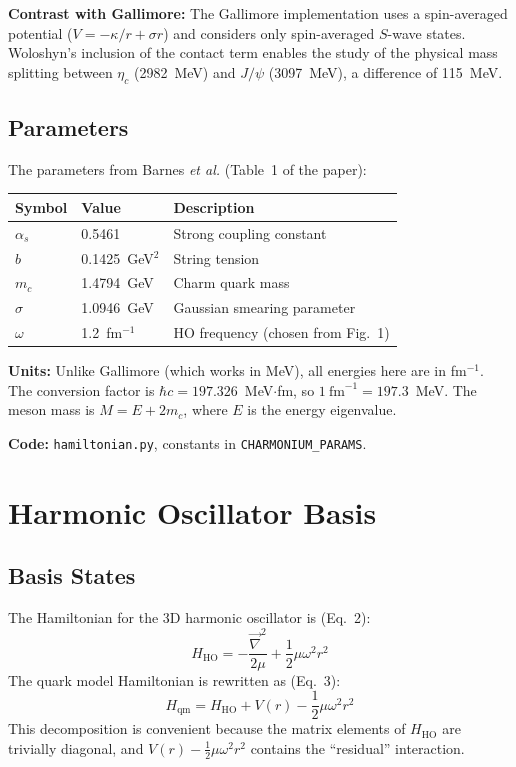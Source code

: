 \documentclass[11pt,a4paper]{article}
\begin{document}
\textbf{Contrast with Gallimore:} The Gallimore implementation uses a spin-averaged potential ($V = -\kappa/r + \sigma r$) and considers only spin-averaged $S$-wave states. Woloshyn's inclusion of the contact term enables the study of the physical mass splitting between $\eta_c$ (2982~MeV) and $J/\psi$ (3097~MeV), a difference of 115~MeV.

\subsection{Parameters}

The parameters from Barnes \textit{et al.} (Table~1 of the paper):
\begin{center}
\begin{tabular}{lll}
\toprule
Symbol & Value & Description \\
\midrule
$\alpha_s$ & 0.5461 & Strong coupling constant \\
$b$ & 0.1425~GeV$^2$ & String tension \\
$m_c$ & 1.4794~GeV & Charm quark mass \\
$\sigma$ & 1.0946~GeV & Gaussian smearing parameter \\
$\omega$ & 1.2~fm$^{-1}$ & HO frequency (chosen from Fig.~1) \\
\bottomrule
\end{tabular}
\end{center}

\textbf{Units:} Unlike Gallimore (which works in MeV), all energies here are in fm$^{-1}$. The conversion factor is $\hbar c = 197.326$~MeV$\cdot$fm, so $1~\text{fm}^{-1} = 197.3$~MeV. The meson mass is $M = E + 2m_c$, where $E$ is the energy eigenvalue.

\vspace{0.3em}
\noindent\textbf{Code:} \texttt{hamiltonian.py}, constants in \texttt{CHARMONIUM\_PARAMS}.


\section{Harmonic Oscillator Basis}

\subsection{Basis States}

The Hamiltonian for the 3D harmonic oscillator is (Eq.~2):
\begin{equation}
  H_{\text{HO}} = -\frac{\vec{\nabla}^2}{2\mu} + \frac{1}{2}\mu\omega^2 r^2
  \label{eq:hho}
\end{equation}
The quark model Hamiltonian is rewritten as (Eq.~3):
\begin{equation}
  H_{\text{qm}} = H_{\text{HO}} + V(r) - \frac{1}{2}\mu\omega^2 r^2
  \label{eq:hqm}
\end{equation}
This decomposition is convenient because the matrix elements of $H_{\text{HO}}$ are trivially diagonal, and $V(r) - \frac{1}{2}\mu\omega^2 r^2$ contains the ``residual'' interaction.
\end{document}
